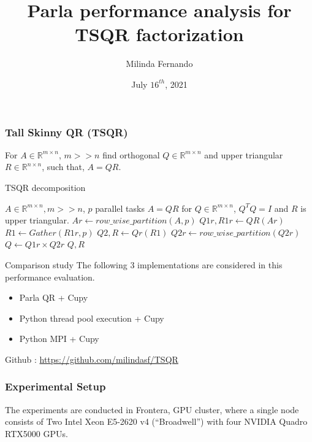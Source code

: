 \documentclass{beamer}
\title{Parla performance analysis for TSQR factorization}
\author{Milinda Fernando}
\institute{Parla Group Meeting}
\date{July $16^{th}$, 2021}
\newcommand{\R}{\mathbb{R}}
\begin{document}
\frame{\titlepage}

\begin{frame}[fragile]
\frametitle{Tall Skinny QR (TSQR)}
For $A\in \R^{m\times n}$, $m>>n$ find orthogonal $Q\in \R^{m\times n}$ and upper triangular $R\in \R^{n\times n}$, such that, $A=QR$.
\begin{algorithm}[H]
    \caption{TSQR decomposition}
    \begin{algorithmic} 
    \REQUIRE $A \in \R^{m\times n}, m>>n$, $p$ parallel tasks
    \ENSURE $A=QR$ for $Q\in \R^{m\times n }$, $Q^TQ=I$ and $R$ is upper triangular.
    \STATE $Ar \leftarrow row\_wise\_partition(A,p)$
    \STATE $Q1r,R1r \leftarrow QR(Ar)$
    \STATE $R1 \leftarrow Gather(R1r,p)$
    \STATE $Q2,R \leftarrow Qr(R1)$
    \STATE $Q2r \leftarrow row\_wise\_partition(Q2r)$ 
    \STATE $Q\leftarrow Q1r \times Q2r$
    \RETURN $Q,R$
    \end{algorithmic}
\end{algorithm}

\end{frame}

\begin{frame}{Comparison study}
The following 3 implementations are considered in this performance evaluation. 
\begin{itemize}
    \item Parla QR + Cupy
    \item Python thread pool execution + Cupy
    \item Python MPI + Cupy
\end{itemize}
Github : \href{https://github.com/milindasf/TSQR}{https://github.com/milindasf/TSQR}
\end{frame}

\begin{frame}
\frametitle{Experimental Setup}
The experiments are conducted in Frontera, GPU cluster, where a single node consists of Two Intel Xeon E5-2620 v4 (“Broadwell”) with four NVIDIA Quadro RTX5000 GPUs.
\end{frame}
\end{document}

